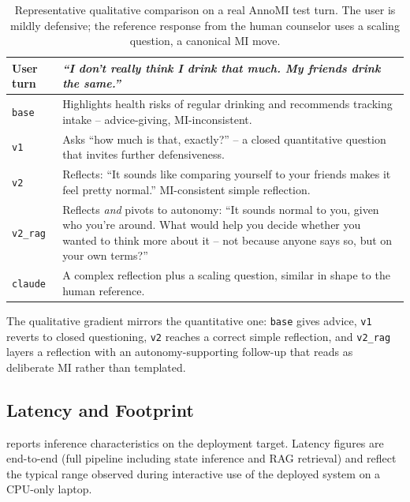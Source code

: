 \begin{table}[h]
\centering
\caption{Representative qualitative comparison on a real AnnoMI test turn.
The user is mildly defensive; the reference response from the human counselor
uses a scaling question, a canonical MI move.}
\label{tab:qual}
\renewcommand{\arraystretch}{1.2}
\begin{tabularx}{\linewidth}{l X}
\toprule
\textbf{User turn} & \textit{``I don't really think I drink that much. My friends drink the same.''} \\
\midrule
\texttt{base}    & Highlights health risks of regular drinking and recommends tracking intake -- advice-giving, MI-inconsistent. \\
\texttt{v1}      & Asks ``how much is that, exactly?'' -- a closed quantitative question that invites further defensiveness. \\
\texttt{v2}      & Reflects: ``It sounds like comparing yourself to your friends makes it feel pretty normal.'' MI-consistent simple reflection. \\
\texttt{v2\_rag} & Reflects \emph{and} pivots to autonomy: ``It sounds normal to you, given who you're around. What would help you decide whether you wanted to think more about it -- not because anyone says so, but on your own terms?'' \\
\texttt{claude}  & A complex reflection plus a scaling question, similar in shape to the human reference. \\
\bottomrule
\end{tabularx}
\end{table}

The qualitative gradient mirrors the quantitative one: \texttt{base} gives
advice, \texttt{v1} reverts to closed questioning, \texttt{v2} reaches a
correct simple reflection, and \texttt{v2\_rag} layers a reflection with an
autonomy-supporting follow-up that reads as deliberate MI rather than
templated.

\subsection{Latency and Footprint}

 reports inference characteristics on the deployment target.
Latency figures are end-to-end (full pipeline including state inference and
RAG retrieval) and reflect the typical range observed during interactive use
of the deployed system on a CPU-only laptop.

